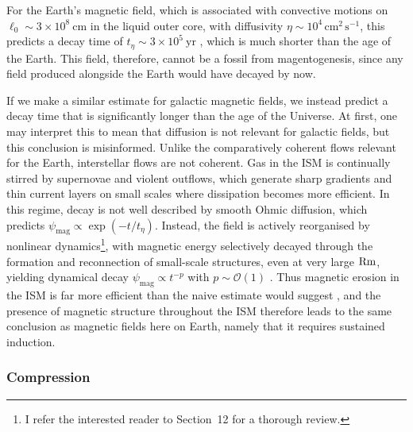For the Earth's magnetic field, which is associated with convective motions on $\ell_0 \sim 3\times 10^8~\mathrm{cm}$ in the liquid outer core, with diffusivity $\eta \sim 10^4 \,\mathrm{cm}^2 \,\mathrm{s}^{-1}$, this predicts a decay time of $t_\eta \sim 3 \times 10^5~\mathrm{yr}$ \citep{choudhuri1998physics}, which is much shorter than the age of the Earth. This field, therefore, cannot be a fossil from magentogenesis, since any field produced alongside the Earth would have decayed by now.

If we make a similar estimate for galactic magnetic fields, we instead predict a decay time that is significantly longer than the age of the Universe. At first, one may interpret this to mean that diffusion is not relevant for galactic fields, but this conclusion is misinformed. Unlike the comparatively coherent flows relevant for the Earth, interstellar flows are not coherent. Gas in the ISM is continually stirred by supernovae and violent outflows, which generate sharp gradients and thin current layers on small scales where dissipation becomes more efficient. In this regime, decay is not well described by smooth Ohmic diffusion, which predicts $\psi_\mathrm{mag} \propto \exp(-t/t_\eta)$. Instead, the field is actively reorganised by nonlinear dynamics\footnote{
    I refer the interested reader to \citet{schekochihin2022mhd} Section~12 for a thorough review.
}, with magnetic energy selectively decayed through the formation and reconnection of small-scale structures, even at very large $\mathrm{Rm}$, yielding dynamical decay $\psi_\mathrm{mag} \propto t^{-p}$ with $p \sim \mathcal{O}(1)$ \citep[see \eg][]{hosking2021reconnection}. Thus magnetic erosion in the ISM is far more efficient than the naive estimate would suggest \citep{brandenburg2025turbulent}, and the presence of magnetic structure throughout the ISM therefore leads to the same conclusion as magnetic fields here on Earth, namely that it requires sustained induction.

\subsubsection{Compression}
\label{sec:evolve:compression}

